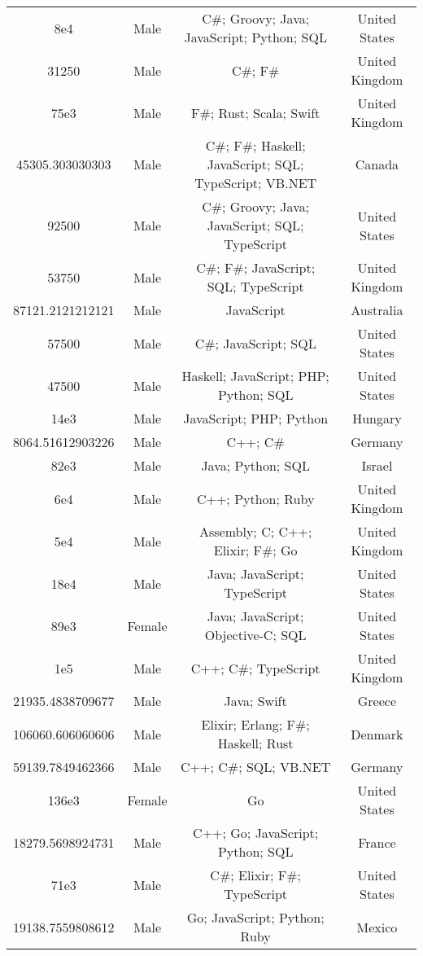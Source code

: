 \begin{center}
\begin{tabular}{ |c|c|c|c| }
8e4  &  Male  &  C\#; Groovy; Java; JavaScript; Python; SQL  &  United States  \\ 
31250  &  Male  &  C\#; F\#  &  United Kingdom  \\ 
75e3  &  Male  &  F\#; Rust; Scala; Swift  &  United Kingdom  \\ 
45305.303030303  &  Male  &  C\#; F\#; Haskell; JavaScript; SQL; TypeScript; VB.NET  &  Canada  \\ 
92500  &  Male  &  C\#; Groovy; Java; JavaScript; SQL; TypeScript  &  United States  \\ 
53750  &  Male  &  C\#; F\#; JavaScript; SQL; TypeScript  &  United Kingdom  \\ 
87121.2121212121  &  Male  &  JavaScript  &  Australia  \\ 
57500  &  Male  &  C\#; JavaScript; SQL  &  United States  \\ 
47500  &  Male  &  Haskell; JavaScript; PHP; Python; SQL  &  United States  \\ 
14e3  &  Male  &  JavaScript; PHP; Python  &  Hungary  \\ 
8064.51612903226  &  Male  &  C++; C\#  &  Germany  \\ 
82e3  &  Male  &  Java; Python; SQL  &  Israel  \\ 
6e4  &  Male  &  C++; Python; Ruby  &  United Kingdom  \\ 
5e4  &  Male  &  Assembly; C; C++; Elixir; F\#; Go  &  United Kingdom  \\ 
18e4  &  Male  &  Java; JavaScript; TypeScript  &  United States  \\ 
89e3  &  Female  &  Java; JavaScript; Objective-C; SQL  &  United States  \\ 
1e5  &  Male  &  C++; C\#; TypeScript  &  United Kingdom  \\ 
21935.4838709677  &  Male  &  Java; Swift  &  Greece  \\ 
106060.606060606  &  Male  &  Elixir; Erlang; F\#; Haskell; Rust  &  Denmark  \\ 
59139.7849462366  &  Male  &  C++; C\#; SQL; VB.NET  &  Germany  \\ 
136e3  &  Female  &  Go  &  United States  \\ 
18279.5698924731  &  Male  &  C++; Go; JavaScript; Python; SQL  &  France  \\ 
71e3  &  Male  &  C\#; Elixir; F\#; TypeScript  &  United States  \\ 
19138.7559808612  &  Male  &  Go; JavaScript; Python; Ruby  &  Mexico  \\ 

\end{tabular}
\end{center}
